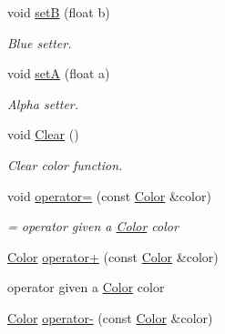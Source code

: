 \begin{DoxyCompactItemize}
void \hyperlink{classColor_a42cac7186652ca335a08f6350e7e1e6a}{setB} (float b)
\begin{DoxyCompactList}\small\item\em Blue setter. \end{DoxyCompactList}\item 
\mbox{\label{classColor_a3b254399aace09b24197673f060d868c}} 
void \hyperlink{classColor_a3b254399aace09b24197673f060d868c}{setA} (float a)
\begin{DoxyCompactList}\small\item\em Alpha setter. \end{DoxyCompactList}\item 
\mbox{\label{classColor_afa7cf91dee89475b96423a0eea0d079d}} 
void \hyperlink{classColor_afa7cf91dee89475b96423a0eea0d079d}{Clear} ()
\begin{DoxyCompactList}\small\item\em Clear color function. \end{DoxyCompactList}\item 
\mbox{\label{classColor_ac06dcf409ae64de5a67c7f6e69b6f44b}} 
void \hyperlink{classColor_ac06dcf409ae64de5a67c7f6e69b6f44b}{operator=} (const \hyperlink{classColor}{Color} \&color)
\begin{DoxyCompactList}\small\item\em = operator given a \hyperlink{classColor}{Color} color \end{DoxyCompactList}\item 
\mbox{\label{classColor_a76d829819622c7da1f39adbc9fcc8785}} 
\hyperlink{classColor}{Color} \hyperlink{classColor_a76d829819622c7da1f39adbc9fcc8785}{operator+} (const \hyperlink{classColor}{Color} \&color)
\begin{DoxyCompactList}\small\item\em 
\begin{DoxyItemize}
\item operator given a \hyperlink{classColor}{Color} color 
\end{DoxyItemize}\end{DoxyCompactList}\item 
\mbox{\label{classColor_a81e6990064f809bf8d0cc63a5e3300c6}} 
\hyperlink{classColor}{Color} \hyperlink{classColor_a81e6990064f809bf8d0cc63a5e3300c6}{operator-\/} (const \hyperlink{classColor}{Color} \&color)

\end{DoxyCompactItemize}
